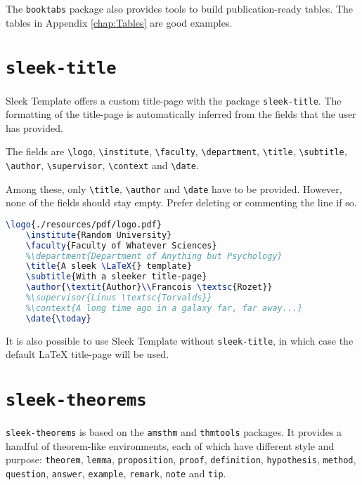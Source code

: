 \documentclass[a4paper, 12pt]{report}
\def\tbs{\textbackslash}
\begin{document}
    The \texttt{booktabs} package also provides tools to build publication-ready tables. The tables in Appendix \ref{chap:Tables} are good examples.

    \newpage

    \section{\texttt{sleek-title}}

    Sleek Template offers a custom title-page with the package \texttt{sleek-title}. The formatting of the title-page is automatically inferred from the fields that the user has provided.

    The fields are \texttt{\tbs{}logo}, \texttt{\tbs{}institute}, \texttt{\tbs{}faculty}, \texttt{\tbs{}department}, \texttt{\tbs{}title}, \texttt{\tbs{}subtitle}, \texttt{\tbs{}author}, \texttt{\tbs{}supervisor}, \texttt{\tbs{}context} and \texttt{\tbs{}date}.

    Among these, only \texttt{\tbs{}title}, \texttt{\tbs{}author} and \texttt{\tbs{}date} have to be provided. However, none of the fields should stay empty. Prefer deleting or commenting the line if so.

    \begin{lstlisting}[style=ruled, language=latex, caption={Example of \texttt{sleek-title} title-page definition.}, gobble=4]
    \logo{./resources/pdf/logo.pdf}
    \institute{Random University}
    \faculty{Faculty of Whatever Sciences}
    %\department{Department of Anything but Psychology}
    \title{A sleek \LaTeX{} template}
    \subtitle{With a sleeker title-page}
    \author{\textit{Author}\\Francois \textsc{Rozet}}
    %\supervisor{Linus \textsc{Torvalds}}
    %\context{A long time ago in a galaxy far, far away...}
    \date{\today}
    \end{lstlisting}

    It is also possible to use Sleek Template without \texttt{sleek-title}, in which case the default \LaTeX{} title-page will be used.

    \newpage

    \section{\texttt{sleek-theorems}}

    \texttt{sleek-theorems} is based on the \texttt{amsthm} and \texttt{thmtools} packages. It provides a handful of theorem-like environments, each of which have different style and purpose: \texttt{theorem}, \texttt{lemma}, \texttt{proposition}, \texttt{proof}, \texttt{definition}, \texttt{hypothesis}, \texttt{method}, \texttt{question}, \texttt{answer}, \texttt{example}, \texttt{remark}, \texttt{note} and \texttt{tip}.
\end{document}

